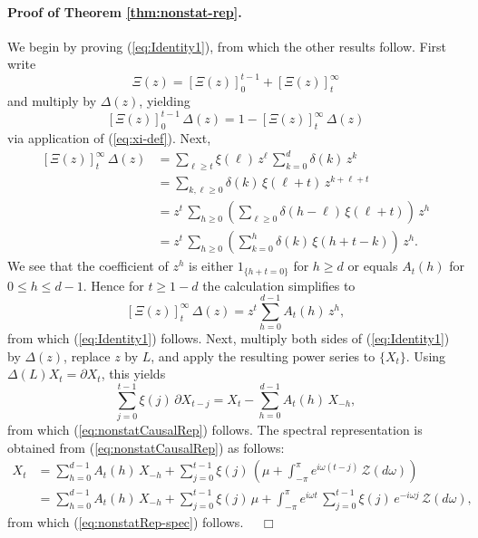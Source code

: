 \documentclass[a4paper]{book}
\begin{document}
\paragraph{Proof of Theorem  \ref{thm:nonstat-rep}.}  
  We begin by proving (\ref{eq:Identity1}), from which the other results follow.
 First write
 \[
  \Xi (z) = {[ \Xi (z) ]}_0^{t-1} + {[ \Xi (z)]}_t^{\infty}
 \]
  and multiply by $\Delta (z)$, yielding
\[
  {[ \Xi (z) ]}_0^{t-1} \, \Delta (z) = 1 -  {[ \Xi (z)]}_t^{\infty}  \, \Delta (z)
\]
via application of (\ref{eq:xi-def}).  Next, 
\begin{align*}
  {[ \Xi (z)]}_t^{\infty}  \, \Delta (z) & = 
     \sum_{\ell \geq t} \xi (\ell) \, z^{\ell}
     \, \sum_{k=0}^d \delta (k) \, z^k \\
  & =   \sum_{k, \ell \geq 0} \delta (k) \, \xi (\ell+t) \, z^{k+\ell+t}  \\
  & = z^t \, \sum_{h \geq 0}  \left( \sum_{\ell \geq 0} 
  \delta (h-\ell) \, \xi (\ell+t) \right) \, z^h \\
    & = z^t \, \sum_{h \geq 0}  \left( \sum_{k=0}^h 
  \delta (k) \, \xi (h+t-k) \right) \, z^h.
\end{align*}
 We see that the coefficient of $z^h$ is either $1_{ \{ h+t =0 \} }$ for $h \geq d$
  or equals $A_t (h)$ for $0 \leq h \leq d-1$.  Hence for $t \geq 1-d$ the calculation
  simplifies to
\[
 {[ \Xi (z)]}_t^{\infty}  \, \Delta (z) =  z^t \sum_{h=0}^{d-1} A_t (h) \, z^h,
\]
 from which  (\ref{eq:Identity1}) follows. 
 Next, multiply both sides of (\ref{eq:Identity1}) by $\Delta (z)$, replace $z$ by $L$,
  and apply the resulting power series to $\{ X_t \}$.  Using
  $\Delta (L) X_t = \partial X_t$, this yields
  \[
   \sum_{j=0}^{t-1} \xi (j) \, \partial X_{t-j} = 
    X_t - \sum_{h=0}^{d-1} A_{t} (h) \, X_{-h},
\]
 from which (\ref{eq:nonstatCausalRep}) follows.  The spectral representation is
  obtained from (\ref{eq:nonstatCausalRep}) as follows:
\begin{align*}
 X_t  & = \sum_{h=0}^{d-1} A_{t} (h) \, X_{-h} + 
  \sum_{j=0}^{t-1} \xi (j) \,  \left( \mu + 
  \int_{-\pi}^{\pi} e^{i \omega (t-j)}  \, \mathcal{Z} (d\omega) \right) \\
  & = \sum_{h=0}^{d-1} A_{t} (h) \, X_{-h} + 
  \sum_{j=0}^{t-1} \xi (j) \, \mu  +
    \int_{-\pi}^{\pi} e^{i \omega t } \, \sum_{j=0}^{t-1} \xi (j) \,e^{-i \omega j}
    \, \mathcal{Z}  (d\omega),
\end{align*}
  from which (\ref{eq:nonstatRep-spec}) follows.  $\quad \Box$
 
\vspace{.5cm}
  
\end{document}
